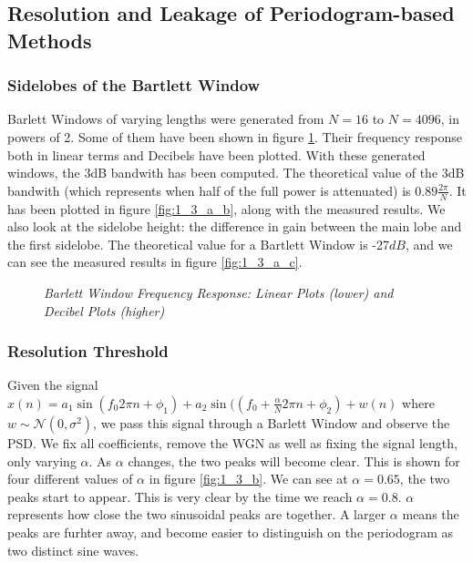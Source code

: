 \documentclass[./main.tex]{subfiles}
\begin{document}
	
\subsection{Resolution and Leakage of Periodogram-based Methods}

\subsubsection{Sidelobes of the Bartlett Window}

Barlett Windows of varying lengths were generated from $N=16$ to $N=4096$, in powers of 2. Some of them have been shown in figure \ref{fig:1_3_a}. Their frequency response both in linear terms and Decibels have been plotted. With these generated windows, the 3dB bandwith has been computed. The theoretical value of the 3dB bandwith (which represents when half of the full power is attenuated) is $ 0.89 \frac{2 \pi}{N} $. It has been plotted in figure \ref{fig:1_3_a_b}, along with the measured results. We also look at the sidelobe height: the difference in gain between the main lobe and the first sidelobe. The theoretical value for a Bartlett Window is -27$dB$, and we can see the measured results in figure \ref{fig:1_3_a_c}.

\begin{figure}[h]
	\centering 
	\resizebox{\textwidth}{!}{}
	\caption{\textit{Barlett Window Frequency Response: Linear Plots (lower) and Decibel Plots (higher)}}
	\label{fig:1_3_a}
\end{figure}


\begin{minipage}{.5\textwidth}
		\center
		\resizebox{\textwidth}{!}{}
		\label{fig:1_3_a_b}
\end{minipage}
\begin{minipage}{.5\textwidth}
	\center
	\resizebox{\textwidth}{!}{}
	\label{fig:1_3_a_c}
\end{minipage}


\subsubsection{Resolution Threshold} \label{sec:1_3_b}
Given the signal $ x(n) = a_1 \sin(f_0 2 \pi n + \phi_1) + a_2 \sin((f_0 + \frac{\alpha}{N} 2 \pi n + \phi_2) + w(n) $ where $ w \sim \mathcal{N} (0, \sigma^2) $, we pass this signal through a Barlett Window and observe the PSD. We fix all coefficients, remove the WGN as well as fixing the signal length, only varying $ \alpha $. As $ \alpha$ changes, the two peaks will become clear. This is shown for four different values of $ \alpha $ in figure \ref{fig:1_3_b}. We can see at $ \alpha = 0.65 $, the two peaks start to appear. This is very clear by the time we reach $ \alpha = 0.8 $. $ \alpha$ represents how close the two sinusoidal peaks are together. A larger $ \alpha $ means the peaks are furhter away, and become easier to distinguish on the periodogram as two distinct sine waves.
\end{document}
